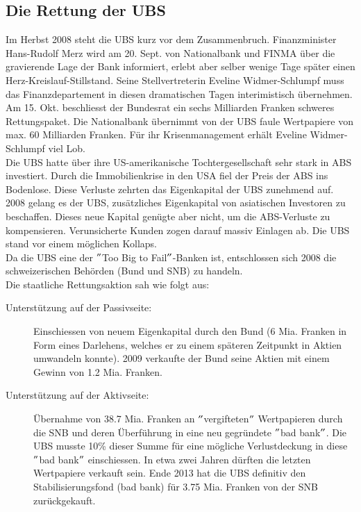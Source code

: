 \subsection{Die Rettung der UBS}
Im Herbst 2008 steht die UBS kurz vor dem Zusammenbruch. Finanzminister Hans-Rudolf Merz wird am 20. Sept. von Nationalbank und FINMA über die gravierende Lage der Bank informiert, erlebt aber selber wenige Tage später einen Herz-Kreislauf-Stillstand. Seine Stellvertreterin Eveline Widmer-Schlumpf muss das Finanzdepartement in diesen dramatischen Tagen interimistisch übernehmen. Am 15. Okt. beschliesst der Bundesrat ein sechs Milliarden Franken schweres Rettungspaket. Die Nationalbank übernimmt von der UBS faule Wertpapiere von max. 60 Milliarden Franken. Für ihr Krisenmanagement erhält Eveline Widmer-Schlumpf viel Lob.\\
Die UBS hatte über ihre US-amerikanische Tochtergesellschaft sehr stark in ABS investiert. Durch die Immobilienkrise in den USA fiel der Preis der ABS ins Bodenlose. Diese Verluste zehrten das Eigenkapital der UBS zunehmend auf.\\
2008 gelang es der UBS, zusätzliches Eigenkapital von asiatischen Investoren zu beschaffen. Dieses neue Kapital genügte aber nicht, um die ABS-Verluste zu kompensieren. Verunsicherte Kunden zogen darauf massiv Einlagen ab. Die UBS stand vor einem möglichen Kollaps.\\
Da die UBS eine der $"$Too Big to Fail$"$-Banken ist, entschlossen sich 2008 die schweizerischen Behörden (Bund und SNB) zu handeln.\\
Die staatliche Rettungsaktion sah wie folgt aus:
\begin{description}
	\item[Unterstützung auf der Passivseite:] Einschiessen von neuem Eigenkapital durch den Bund (6 Mia. Franken in Form eines Darlehens, welches er zu einem späteren Zeitpunkt in Aktien umwandeln konnte). 2009 verkaufte der Bund seine Aktien mit einem Gewinn von 1.2 Mia. Franken.
	\item[Unterstützung auf der Aktivseite:] Übernahme von 38.7 Mia. Franken an $"$vergifteten$"$ Wertpapieren durch die SNB und deren Überführung in eine neu gegründete $"$bad bank$"$. Die UBS musste 10\% dieser Summe für eine mögliche Verlustdeckung in diese $"$bad bank$"$ einschiessen. In etwa zwei Jahren dürften die letzten Wertpapiere verkauft sein. Ende 2013 hat die UBS definitiv den Stabilisierungsfond (bad bank) für 3.75 Mia. Franken von der SNB zurückgekauft.
\end{description}

